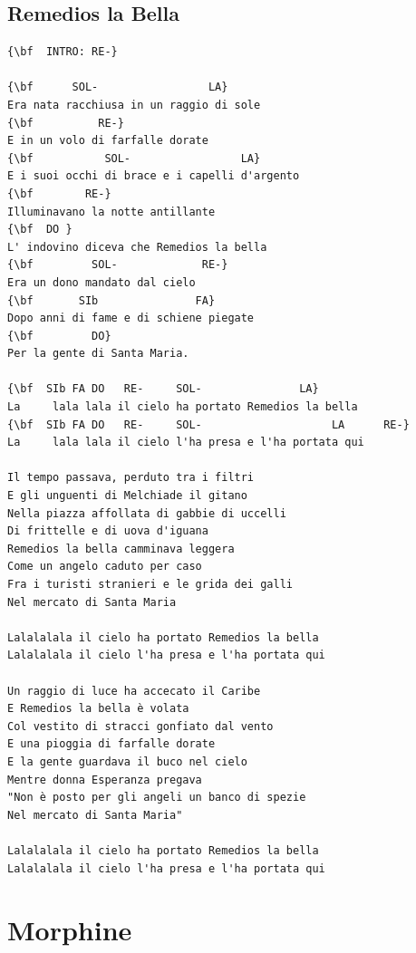 \documentclass[a4paper]{article}
\begin{document}
\subsection{Remedios la Bella}
\begin{Verbatim}[commandchars=\\\{\}]
{\bf  INTRO: RE-}

{\bf      SOL-                 LA}
Era nata racchiusa in un raggio di sole
{\bf          RE-}
E in un volo di farfalle dorate
{\bf           SOL-                 LA}
E i suoi occhi di brace e i capelli d'argento
{\bf        RE-}
Illuminavano la notte antillante
{\bf  DO }
L' indovino diceva che Remedios la bella
{\bf         SOL-             RE-}
Era un dono mandato dal cielo
{\bf       SIb               FA}
Dopo anni di fame e di schiene piegate
{\bf         DO}
Per la gente di Santa Maria.

{\bf  SIb FA DO   RE-     SOL-               LA}
La     lala lala il cielo ha portato Remedios la bella
{\bf  SIb FA DO   RE-     SOL-                    LA      RE-}
La     lala lala il cielo l'ha presa e l'ha portata qui

Il tempo passava, perduto tra i filtri 
E gli unguenti di Melchiade il gitano
Nella piazza affollata di gabbie di uccelli 
Di frittelle e di uova d'iguana
Remedios la bella camminava leggera
Come un angelo caduto per caso
Fra i turisti stranieri e le grida dei galli
Nel mercato di Santa Maria

Lalalalala il cielo ha portato Remedios la bella
Lalalalala il cielo l'ha presa e l'ha portata qui

Un raggio di luce ha accecato il Caribe
E Remedios la bella è volata
Col vestito di stracci gonfiato dal vento
E una pioggia di farfalle dorate
E la gente guardava il buco nel cielo
Mentre donna Esperanza pregava
"Non è posto per gli angeli un banco di spezie
Nel mercato di Santa Maria"

Lalalalala il cielo ha portato Remedios la bella
Lalalalala il cielo l'ha presa e l'ha portata qui

\end{Verbatim}
\newpage
\section{Morphine}
\end{document}
